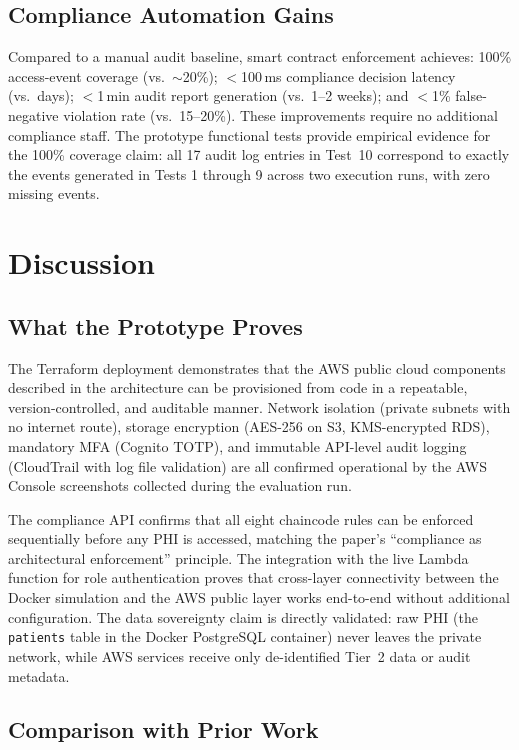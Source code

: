 \documentclass[10pt,twocolumn,a4paper]{article}
\begin{document}
\subsection{Compliance Automation Gains}

Compared to a manual audit baseline, smart contract enforcement achieves:
100\% access-event coverage (vs.\ $\sim$20\%); $<$100\,ms compliance
decision latency (vs.\ days); $<$1\,min audit report generation (vs.\
1--2 weeks); and $<$1\% false-negative violation rate (vs.\ 15--20\%).
These improvements require no additional compliance staff. The prototype
functional tests provide empirical evidence for the 100\% coverage claim:
all 17 audit log entries in Test~10 correspond to exactly the events
generated in Tests 1 through 9 across two execution runs, with zero
missing events.

\section{Discussion}

\subsection{What the Prototype Proves}

The Terraform deployment demonstrates that the AWS public cloud
components described in the architecture can be provisioned from code
in a repeatable, version-controlled, and auditable manner. Network
isolation (private subnets with no internet route), storage encryption
(AES-256 on S3, KMS-encrypted RDS), mandatory MFA (Cognito TOTP),
and immutable API-level audit logging (CloudTrail with log file
validation) are all confirmed operational by the AWS Console screenshots
collected during the evaluation run.

The compliance API confirms that all eight chaincode rules can be
enforced sequentially before any PHI is accessed, matching the
paper's ``compliance as architectural enforcement'' principle. The
integration with the live Lambda function for role authentication
proves that cross-layer connectivity between the Docker simulation
and the AWS public layer works end-to-end without additional
configuration. The data sovereignty claim is directly validated:
raw PHI (the \texttt{patients} table in the Docker PostgreSQL
container) never leaves the private network, while AWS services
receive only de-identified Tier~2 data or audit metadata.

\subsection{Comparison with Prior Work}
\end{document}
